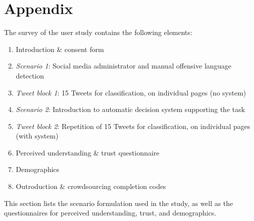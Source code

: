 \section{Appendix}

The survey of the user study contains the following elements:
\begin{enumerate}
	\item Introduction \& consent form
	\item \textit{Scenario 1}: Social media administrator and manual offensive language detection
	\item \textit{Tweet block 1}: 15 Tweets for classification, on individual pages (no system)
	\item \textit{Scenario 2}: Introduction to automatic decision system supporting the task
	\item \textit{Tweet block 2}: Repetition of 15 Tweets for classification, on individual pages (with system)
	\item Perceived understanding \& trust questionnaire
	\item Demographics
	\item Outroduction \& crowdsourcing completion codes
\end{enumerate}
This section lists the scenario formulation used in the study, as well as the questionnaires for perceived understanding, trust, and demographics.

